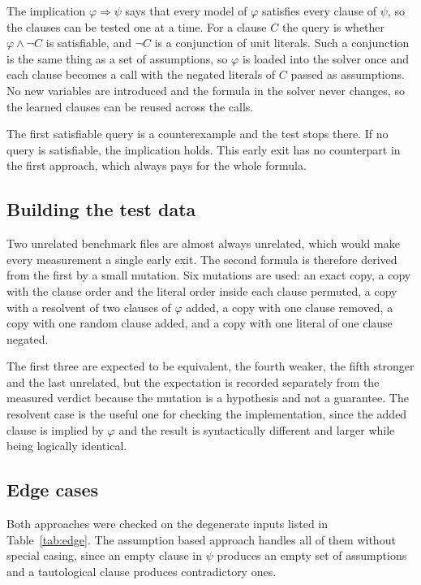 \documentclass[11pt,a4paper]{article}
\begin{document}
The implication $\varphi \Rightarrow \psi$ says that every model of $\varphi$
satisfies every clause of $\psi$, so the clauses can be tested one at a time.
For a clause $C$ the query is whether $\varphi \wedge \neg C$ is satisfiable,
and $\neg C$ is a conjunction of unit literals. Such a conjunction is the same
thing as a set of assumptions, so $\varphi$ is loaded into the solver once and each
clause becomes a call with the negated literals of $C$ passed as assumptions.
No new variables are introduced and the formula in the solver never changes,
so the learned clauses can be reused across the calls.

The first satisfiable query is a counterexample and the test stops there. If
no query is satisfiable, the implication holds. This early exit has no
counterpart in the first approach, which always pays for the whole formula.

\subsection*{Building the test data}

Two unrelated benchmark files are almost always unrelated, which would make
every measurement a single early exit. The second formula is therefore
derived from the first by a small mutation. Six mutations are used: an exact
copy, a copy with the clause order and the literal order inside each clause
permuted, a copy with a resolvent of two clauses of $\varphi$ added, a copy
with one clause removed, a copy with one random clause added, and a copy with
one literal of one clause negated.

The first three are expected to be equivalent, the fourth weaker, the fifth
stronger and the last unrelated, but the expectation is recorded separately
from the measured verdict because the mutation is a hypothesis and not a
guarantee. The resolvent case is the useful one for checking the
implementation, since the added clause is implied by $\varphi$ and the result
is syntactically different and larger while being logically identical.

\subsection*{Edge cases}

Both approaches were checked on the degenerate inputs listed in
Table~\ref{tab:edge}. The assumption based approach handles all of them
without special casing, since an empty clause in $\psi$ produces an empty set
of assumptions and a tautological clause produces contradictory ones.
\end{document}
